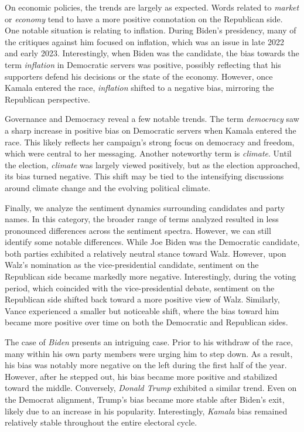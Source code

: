 On economic policies, the trends are largely as expected. Words related to \textit{market} or \textit{economy} tend to have a more positive connotation on the Republican side. One notable situation is relating to inflation. During Biden's presidency, many of the critiques against him focused on inflation, which was an issue in late 2022 and early 2023. Interestingly, when Biden was the candidate, the bias towards the term \textit{inflation} in Democratic servers was positive, possibly reflecting that his supporters defend his decisions or the state of the economy. However, once Kamala entered the race, \textit{inflation} shifted to a negative bias, mirroring the Republican perspective.

Governance and Democracy reveal a few notable trends. The term \textit{democracy} saw a sharp increase in positive bias on Democratic servers when Kamala entered the race. This likely reflects her campaign's strong focus on democracy and freedom, which were central to her messaging. Another noteworthy term is \textit{climate}. Until the election, \textit{climate} was largely viewed positively, but as the election approached, its bias turned negative. This shift may be tied to the intensifying discussions around climate change and the evolving political climate.

Finally, we analyze the sentiment dynamics surrounding candidates and party names. In this category, the broader range of terms analyzed resulted in less pronounced differences across the sentiment spectra. However, we can still identify some notable differences. While Joe Biden was the Democratic candidate, both parties exhibited a relatively neutral stance toward Walz. However, upon Walz’s nomination as the vice-presidential candidate, sentiment on the Republican side became markedly more negative.  Interestingly, during the voting period, which coincided with the vice-presidential debate, sentiment on the Republican side shifted back toward a more positive view of Walz. Similarly, Vance experienced a smaller but noticeable shift, where the bias toward him became more positive over time on both the Democratic and Republican sides.


The case of \textit{Biden} presents an intriguing case. Prior to his withdraw of the race, many within his own party members were urging him to step down. As a result, his bias was notably more negative on the left during the first half of the year. However, after he stepped out, his bias became more positive and stabilized toward the middle. Conversely, \textit{Donald Trump} exhibited a similar trend. Even on the Democrat alignment, Trump’s bias became more stable after Biden’s exit, likely due to an increase in his popularity. Interestingly, \textit{Kamala} bias remained relatively stable throughout the entire electoral cycle.

